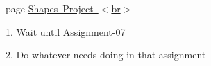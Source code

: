 
\begin{DoxyRefList}
\item[page \mbox{\hyperlink{index}{Shapes Project $<$br$>$}} ]\label{todo__todo000001}%
%
 

1. Wait until Assignment-\/07 

2. Do whatever needs doing in that assignment
\end{DoxyRefList}